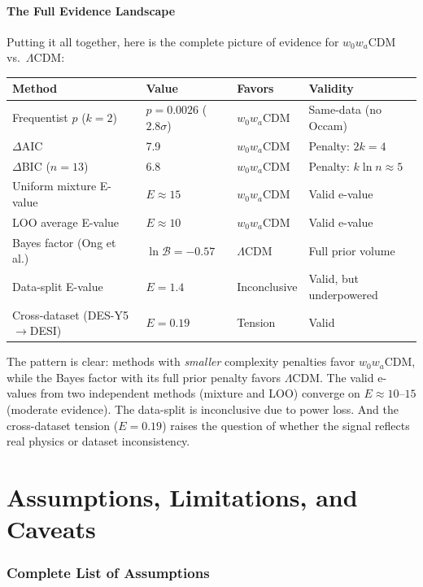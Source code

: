 \documentclass[11pt,a4paper]{article}
\newcommand{\LCDM}{$\Lambda$CDM}
\begin{document}
\subsection{The Full Evidence Landscape}

Putting it all together, here is the complete picture of evidence for $w_0w_a$CDM vs.\ \LCDM:

\begin{center}
\begin{tabular}{llll}
\toprule
\textbf{Method} & \textbf{Value} & \textbf{Favors} & \textbf{Validity} \\
\midrule
Frequentist $p$ ($k=2$) & $p = 0.0026$ ($2.8\sigma$) & $w_0w_a$CDM & Same-data (no Occam) \\
$\Delta$AIC & 7.9 & $w_0w_a$CDM & Penalty: $2k=4$ \\
$\Delta$BIC ($n=13$) & 6.8 & $w_0w_a$CDM & Penalty: $k\ln n \approx 5$ \\
Uniform mixture E-value & $E \approx 15$ & $w_0w_a$CDM & Valid e-value \\
LOO average E-value & $E \approx 10$ & $w_0w_a$CDM & Valid e-value \\
Bayes factor (Ong et al.) & $\ln\mathcal{B} = -0.57$ & \LCDM & Full prior volume \\
Data-split E-value & $E = 1.4$ & Inconclusive & Valid, but underpowered \\
Cross-dataset (DES-Y5$\to$DESI) & $E = 0.19$ & Tension & Valid \\
\bottomrule
\end{tabular}
\end{center}

The pattern is clear: methods with \textit{smaller} complexity penalties favor $w_0w_a$CDM, while the Bayes factor with its full prior penalty favors \LCDM. The valid e-values from two independent methods (mixture and LOO) converge on $E \approx 10$--$15$ (moderate evidence). The data-split is inconclusive due to power loss. And the cross-dataset tension ($E = 0.19$) raises the question of whether the signal reflects real physics or dataset inconsistency.


\part{Assumptions, Limitations, and Caveats}

\section{Complete List of Assumptions}
\label{sec:assumptions}
\end{document}
